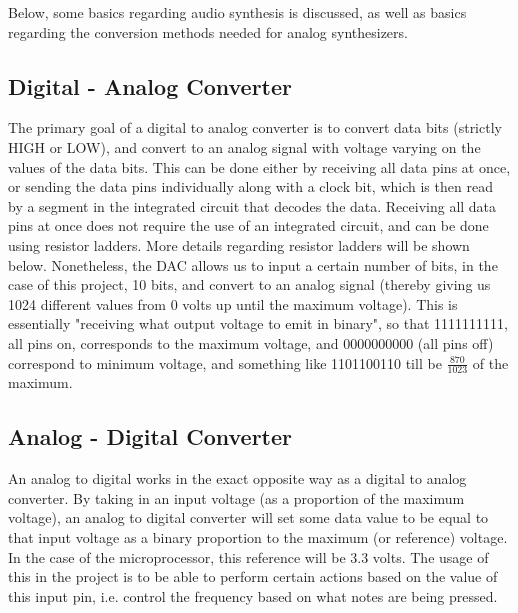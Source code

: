 
Below, some basics regarding audio synthesis is discussed, as well as basics regarding the conversion methods needed for analog synthesizers. 

\subsection{Digital - Analog Converter}\label{subsec:digital---analog-converter}

The primary goal of a digital to analog converter is to convert data bits (strictly HIGH or LOW), and convert to an analog signal with voltage varying on the values of the data bits.
This can be done either by receiving all data pins at once, or sending the data pins individually along with a clock bit, which is then read by a segment in the integrated circuit that decodes the data.
Receiving all data pins at once does not require the use of an integrated circuit, and can be done using resistor ladders.
More details regarding resistor ladders will be shown below.
Nonetheless, the DAC allows us to input a certain number of bits, in the case of this project, 10 bits, and convert to an analog signal (thereby giving us 1024 different values from 0 volts up until the maximum voltage).
This is essentially "receiving what output voltage to emit in binary", so that 1111111111, all pins on, corresponds to the maximum voltage, and 0000000000 (all pins off) correspond to minimum voltage, and something like 1101100110 till be $\frac{870}{1023}$ of the maximum. 

\subsection{Analog - Digital Converter}\label{subsec:analog---digital-converter}

An analog to digital works in the exact opposite way as a digital to analog converter.
By taking in an input voltage (as a proportion of the maximum voltage), an analog to digital converter will set some data value to be equal to that input voltage as a binary proportion to the maximum (or reference) voltage.
In the case of the microprocessor, this reference will be 3.3 volts.
The usage of this in the project is to be able to perform certain actions based on the value of this input pin, i.e. control the frequency based on what notes are being pressed. 

